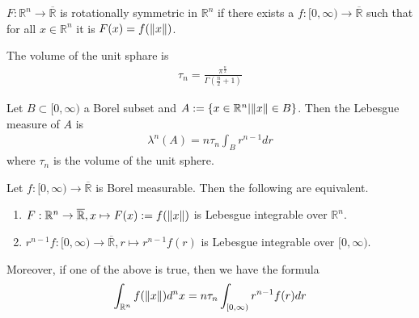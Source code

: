 \begin{definition}
    \(F: \mathbb{R}^n \rightarrow \overline{\mathbb{R}}\) is rotationally symmetric in \(\mathbb{R}^n\) if there exists a \(f: [0, \infty) \rightarrow \overline{\mathbb{R}}\) such that for all \(x \in \mathbb{R}^n\) it is \(F(x) = f(\left\lVert x\right\rVert)\).
\end{definition}
\begin{theorem}
    The volume of the unit sphare is
    \begin{align}
        \tau_n = \frac{\pi^{\frac{n}{2}}}{\Gamma(\frac{n}{2} + 1)}
    \end{align}
\end{theorem}
%
\begin{theorem}
    Let \(B \subset [0, \infty)\) a Borel subset and \(A := \left\{ x \in \mathbb{R}^n \middle| \left\lVert x\right\rVert \in B \right\}\). Then the Lebesgue measure of \(A\) is
    \begin{align}
        \lambda^n (A) = n \tau_n \int_B r^{n-1} dr
    \end{align}
    where \(\tau_n\) is the volume of the unit sphere.
\end{theorem}
%
\begin{theorem}
    Let \(f:[0, \infty) \rightarrow \overline{\mathbb{R}}\) is Borel measurable. Then the following are equivalent.
    \begin{enumerate}
        \item \(F: \mathbb{R}^n \rightarrow \overline{\mathbb{R}}, x \mapsto F(x) := f(\left\lVert x\right\rVert)\) is Lebesgue integrable over \(\mathbb{R}^n\).
        \item \(r^{n-1} f: [0, \infty) \rightarrow \overline{\mathbb{R}}, r \mapsto r^{n-1}f(r)\) is Lebesgue integrable over \([0, \infty)\).
    \end{enumerate}
    Moreover, if one of the above is true, then we have the formula
    \begin{align}
        \int_{\mathbb{R}^n} f(\left\lVert x\right\rVert) d^n x = n \tau_n \int_{[0, \infty)} r^{n-1}f(r)dr
    \end{align}
\end{theorem}
%
%
%
%
%
